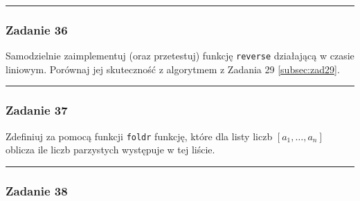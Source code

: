 \documentclass[11pt,a4paper]{article}
\begin{document}
\bigskip
\hrule
\bigskip


\subsubsection{Zadanie 36}
Samodzielnie zaimplementuj (oraz przetestuj) funkcję \texttt{reverse} działającą w czasie liniowym. Porównaj jej skuteczność z algorytmem z Zadania 29 \ref{subsec:zad29}.

\bigskip
\hrule
\bigskip


\subsubsection{Zadanie 37}
Zdefiniuj za pomocą funkcji \texttt{foldr} funkcję, które dla listy liczb $[a_1, \dots, a_n]$ oblicza ile liczb parzystych występuje w tej liście.

\bigskip
\hrule
\bigskip


\subsubsection{Zadanie 38}
\end{document}
